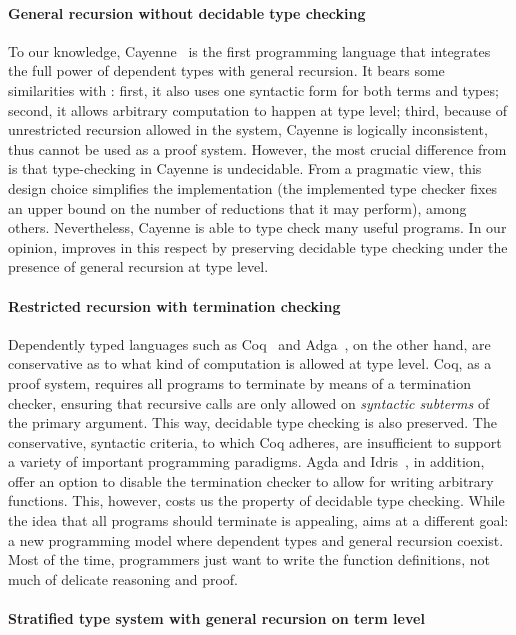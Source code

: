 \paragraph{General recursion without decidable type checking} To our
knowledge, Cayenne~\cite{cayenne} is the first programming language
that integrates the full power of dependent types with general
recursion. It bears some similarities with \name: first, it also uses
one syntactic form for both terms and types; second, it allows
arbitrary computation to happen at type level; third, because of
unrestricted recursion allowed in the system, Cayenne is logically
inconsistent, thus cannot be used as a proof system. However, the most
crucial difference from \name is that type-checking in Cayenne is
undecidable. From a pragmatic view, this design choice simplifies the
implementation (the implemented type checker fixes an upper bound on
the number of reductions that it may perform), among
others. Nevertheless, Cayenne is able to type check many useful
programs. In our opinion, \name improves in this respect by preserving
decidable type checking under the presence of general recursion at
type level.


\paragraph{Restricted recursion with termination checking}

Dependently typed languages such as Coq~\cite{coqsite} and
Adga~\cite{agda}, on the other hand, are conservative as to what kind
of computation is allowed at type level. Coq, as a proof system,
requires all programs to terminate by means of a termination checker,
ensuring that recursive calls are only allowed on \emph{syntactic
  subterms} of the primary argument. This way, decidable type checking
is also preserved. The conservative, syntactic criteria, to which Coq
adheres, are insufficient to support a variety of important
programming paradigms. Agda and Idris~\cite{idris}, in addition, offer
an option to disable the termination checker to allow for writing
arbitrary functions. This, however, costs us the property of decidable
type checking. While the idea that all programs should terminate is
appealing, \name aims at a different goal: a new programming model
where dependent types and general recursion coexist. Most of the time,
programmers just want to write the function definitions, not much of
delicate reasoning and proof.

\paragraph{Stratified type system with general recursion on term level}

